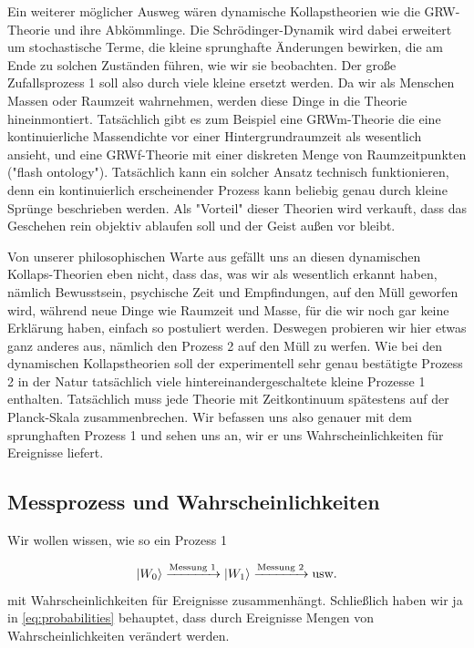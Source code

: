 \documentclass[12pt]{book}
\begin{document}
Ein weiterer möglicher Ausweg wären dynamische Kollapstheorien wie die GRW-Theorie und ihre Abkömmlinge. Die Schrödinger-Dynamik wird dabei erweitert um stochastische Terme, die kleine sprunghafte Änderungen bewirken, die am Ende zu solchen Zuständen führen, wie wir sie beobachten. Der große Zufallsprozess 1 soll also durch viele kleine ersetzt werden. Da wir als Menschen Massen oder Raumzeit wahrnehmen, werden diese Dinge in die Theorie hineinmontiert. Tatsächlich gibt es zum Beispiel eine GRWm-Theorie die eine kontinuierliche Massendichte vor einer Hintergrundraumzeit als wesentlich ansieht, und eine GRWf-Theorie mit einer diskreten Menge von Raumzeitpunkten ("flash ontology"). Tatsächlich kann ein solcher Ansatz technisch funktionieren, denn ein kontinuierlich erscheinender Prozess kann beliebig genau durch kleine Sprünge beschrieben werden. Als "Vorteil" dieser Theorien wird verkauft, dass das Geschehen rein objektiv ablaufen soll und der Geist außen vor bleibt. 

Von unserer philosophischen Warte aus gefällt uns an diesen dynamischen Kollaps-Theorien eben nicht, dass das, was wir als wesentlich erkannt haben, nämlich Bewusstsein, psychische Zeit und Empfindungen, auf den Müll geworfen wird, während neue Dinge wie Raumzeit und Masse, für die wir noch gar keine Erklärung haben, einfach so postuliert werden. Deswegen probieren wir hier etwas ganz anderes aus, nämlich den Prozess 2 auf den Müll zu werfen. Wie bei den dynamischen Kollapstheorien soll der experimentell sehr genau bestätigte Prozess 2 in der Natur tatsächlich viele hintereinandergeschaltete kleine Prozesse 1 enthalten. Tatsächlich muss jede Theorie mit Zeitkontinuum spätestens auf der Planck-Skala zusammenbrechen. Wir befassen uns also genauer mit dem sprunghaften Prozess 1 und sehen uns an, wir er uns Wahrscheinlichkeiten für Ereignisse liefert.

\subsection{Messprozess und Wahrscheinlichkeiten}

Wir wollen wissen, wie so ein Prozess 1 

\begin{equation} \label{eq:probabilities_qm}
\ket{W_0} \xrightarrow{\textrm{Messung 1}} 
\ket{W_1} \xrightarrow{\textrm{Messung 2}}  \textrm{usw.}
\end{equation}
mit Wahrscheinlichkeiten für Ereignisse zusammenhängt. Schließlich haben wir ja in \ref{eq:probabilities} behauptet, dass durch Ereignisse Mengen von Wahrscheinlichkeiten verändert werden. 
\end{document}
